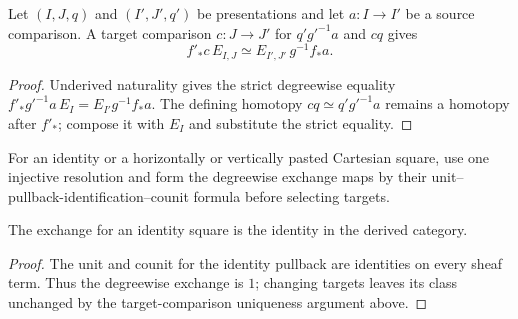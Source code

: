 \begin{lemma}
\label{lemma:weil-pbc-derived-exchange-naturality-square-v5}
Let $(I,J,q)$ and $(I',J',q')$ be presentations and let $a:I\to I'$ be a
source comparison.  A target comparison $c:J\to J'$ for $q'g'^{-1}a$ and
$cq$ gives
\[
 f'_*c\,E_{I,J}\simeq E_{I',J'}\,g^{-1}f_*a.
\]
\end{lemma}
\begin{proof}
Underived naturality gives the strict degreewise equality
$f'_*g'^{-1}a\,E_I=E_{I'}g^{-1}f_*a$.  The defining homotopy
$cq\simeq q'g'^{-1}a$ remains a homotopy after $f'_*$; compose it with
$E_I$ and substitute the strict equality.
\end{proof}

\begin{definition}
\label{def:weil-pbc-derived-exchange-pasting-presentations-v5}
For an identity or a horizontally or vertically pasted Cartesian square, use
one injective resolution and form the degreewise exchange maps by their
unit--pullback-identification--counit formula before selecting targets.
\end{definition}

\begin{lemma}
\label{lemma:weil-pbc-derived-exchange-identity-v5}
The exchange for an identity square is the identity in the derived category.
\end{lemma}
\begin{proof}
The unit and counit for the identity pullback are identities on every sheaf
term.  Thus the degreewise exchange is $1$; changing targets leaves its class
unchanged by the target-comparison uniqueness argument above.
\end{proof}

